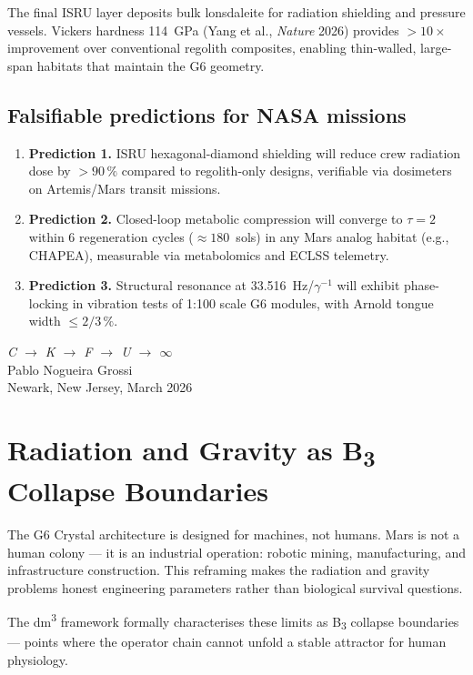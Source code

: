 The final ISRU layer deposits bulk lonsdaleite for radiation shielding and pressure vessels. Vickers hardness 114~GPa (Yang et al., \emph{Nature} 2026) provides $>10\times$ improvement over conventional regolith composites, enabling thin-walled, large-span habitats that maintain the G6 geometry.

\section{Falsifiable predictions for NASA missions}

\begin{enumerate}
\item \textbf{Prediction 1.} ISRU hexagonal-diamond shielding will reduce crew radiation dose by $>90\,\%$ compared to regolith-only designs, verifiable via dosimeters on Artemis/Mars transit missions.
\item \textbf{Prediction 2.} Closed-loop metabolic compression will converge to \(\tau = 2\) within 6 regeneration cycles ($\approx 180$~sols) in any Mars analog habitat (e.g., CHAPEA), measurable via metabolomics and ECLSS telemetry.
\item \textbf{Prediction 3.} Structural resonance at 33.516~Hz/$\gamma^{-1}$ will exhibit phase-locking in vibration tests of 1:100 scale G6 modules, with Arnold tongue width $\le 2/3\,\%$.
\end{enumerate}

\bigskip
\begin{flushright}
\textit{C \;$\to$\; K \;$\to$\; F \;$\to$\; U \;$\to$\; $\infty$}\\[0.3em]
Pablo Nogueira Grossi\\
Newark, New Jersey, March 2026
\end{flushright}

\chapter{Radiation and Gravity as B\textsubscript{3} Collapse Boundaries}

The G6 Crystal architecture is designed for machines, not humans. Mars is not a human colony --- it is an industrial operation: robotic mining, manufacturing, and infrastructure construction. This reframing makes the radiation and gravity problems honest engineering parameters rather than biological survival questions.

The dm\textsuperscript{3} framework formally characterises these limits as B\textsubscript{3} collapse boundaries --- points where the operator chain cannot unfold a stable attractor for human physiology.

